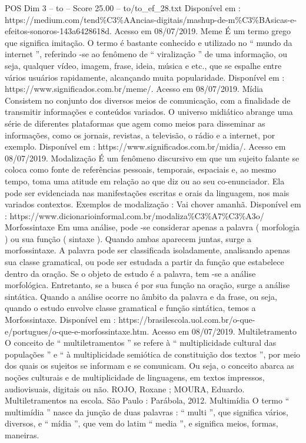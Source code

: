 \begin{textsample}{POS Dim 3 – to – Score 25.00 – to/to\_ef\_28.txt}
Disponível em : https://medium.com/tend\%C3\%AAncias-digitais/mashup-de-m\%C3\%BAsicas-e-efeitos-sonoros-143a6428618d.
Acesso em 08/07/2019.
Meme É um termo grego que significa imitação.
O termo é bastante conhecido e utilizado no “ mundo da internet ”, referindo -se ao fenômeno de “ viralização ” de uma informação, ou seja, qualquer vídeo, imagem, frase, ideia, música e etc., que se espalhe entre vários usuários rapidamente, alcançando muita popularidade.
Disponível em : https://www.significados.com.br/meme/.
Acesso em 08/07/2019.
Mídia Consistem no conjunto dos diversos meios de comunicação, com a finalidade de transmitir informações e conteúdos variados.
O universo midiático abrange uma série de diferentes plataformas que agem como meios para disseminar as informações, como os jornais, revistas, a televisão, o rádio e a internet, por exemplo.
Disponível em : https://www.significados.com.br/midia/.
Acesso em 08/07/2019.
Modalização É um fenômeno discursivo em que um sujeito falante se coloca como fonte de referências pessoais, temporais, espaciais e, ao mesmo tempo, toma uma atitude em relação ao que diz ou ao seu co-enunciador.
Ela pode ser evidenciada nas manifestações escritas e orais da linguagem, nos mais variados contextos.
Exemplos de modalização : Vai chover amanhã.
Disponível em : https://www.dicionarioinformal.com.br/modaliza\%C3\%A7\%C3\%A3o/ Morfossintaxe Em uma análise, pode -se considerar apenas a palavra ( morfologia ) ou sua função ( sintaxe ).
Quando ambas aparecem juntas, surge a morfossintaxe.
A palavra pode ser classificada isoladamente, analisando apenas sua classe gramatical, ou pode ser estudada a partir da função que estabelece dentro da oração.
Se o objeto de estudo é a palavra, tem -se a análise morfológica.
Entretanto, se a busca é por sua função na oração, surge a análise sintática.
Quando a análise ocorre no âmbito da palavra e da frase, ou seja, quando o estudo envolve classe gramatical e função sintática, temos a Morfossintaxe.
Disponível em : https://brasilescola.uol.com.br/o-que-e/portugues/o-que-e-morfossintaxe.htm.
Acesso em 08/07/2019.
Multiletramento O conceito de “ multiletramentos ” se refere à “ multiplicidade cultural das populações ” e “ à multiplicidade semiótica de constituição dos textos ”, por meio dos quais os sujeitos se informam e se comunicam.
Ou seja, o conceito abarca as noções culturais e de multiplicidade de linguagens, em textos impressos, audiovisuais, digitais ou não.
ROJO, Roxane ; MOURA, Eduardo.
Multiletramentos na escola.
São Paulo : Parábola, 2012.
Multimídia O termo “ multimídia ” nasce da junção de duas palavras : “ multi ”, que significa vários, diversos, e “ mídia ”, que vem do latim “ media ”, e significa meios, formas, maneiras.

\end{textsample}

